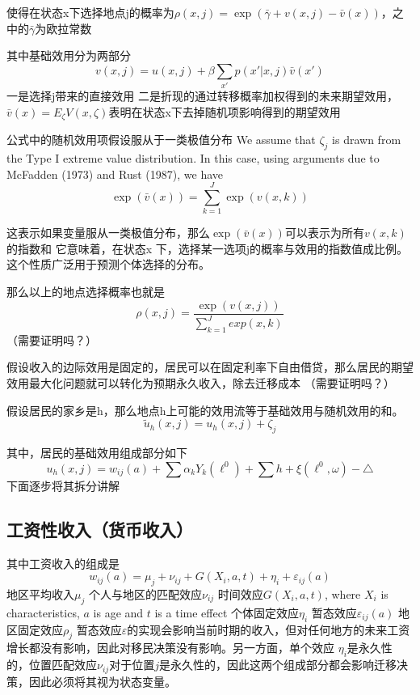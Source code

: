\documentclass[a4paper,10pt]{article}
\begin{document}
使得在状态x下选择地点j的概率为$\rho(x,j)=\exp(\bar \gamma+v(x,j)-\bar v(x))$，之中的$\bar \gamma$为欧拉常数

其中基础效用分为两部分
\begin{equation}
  v(x, j) = u(x, j) + \beta \sum_{x'} p(x' | x, j) \bar{v}(x')
\end{equation}
一是选择j带来的直接效用
二是折现的通过转移概率加权得到的未来期望效用，$\bar{v}(x) = E_{\zeta} V(x, \zeta)$表明在状态x下去掉随机项影响得到的期望效用

公式中的随机效用项假设服从于一类极值分布
We assume that $\zeta_j$ is drawn from the Type I extreme value distribution. In this case, using arguments due to McFadden (1973) and Rust (1987), we have
\begin{equation}
  \exp\left(\bar{v}(x)\right) = \sum_{k=1}^J \exp\left(v(x, k)\right)
\end{equation}

这表示如果变量服从一类极值分布，那么$\exp\left(\bar{v}(x)\right)$可以表示为所有$v(x, k)$的指数和
它意味着，在状态x 下，选择某一选项j的概率与效用的指数值成比例。
这个性质广泛用于预测个体选择的分布。

那么以上的地点选择概率也就是
\begin{equation}
  \rho(x,j)=\frac{\exp(v(x,j))}{\sum\limits_{k=1}^{J} exp(x,k)}
\end{equation}
（需要证明吗？）

假设收入的边际效用是固定的，居民可以在固定利率下自由借贷，那么居民的期望效用最大化问题就可以转化为预期永久收入，除去迁移成本
（需要证明吗？）

假设居民的家乡是h，那么地点h上可能的效用流等于基础效用与随机效用的和。
\begin{equation}
  \tilde u_{h}(x,j)=u_{h}(x,j) +\zeta_j
\end{equation}

其中，居民的基础效用组成部分如下
\begin{equation}
  u_h(x,j)=w_{ij}(a)+\sum\limits \alpha_{k}Y_{k}(\ell^{0})+\sum\limits h +\xi(\ell^{0},\omega)-\triangle
\end{equation}
下面逐步将其拆分讲解


\subsection{工资性收入（货币收入）}
其中工资收入的组成是
\begin{equation}
  w_{ij}(a)=\mu_j+\nu_{ij}+G(X_i,a,t)+\eta_i+\varepsilon_{ij}(a)
\end{equation}
地区平均收入$\mu_j$
个人与地区的匹配效应$\nu_{ij}$
时间效应$G(X_{i},a,t)$, where $X_{i}$ is characteristics, $a$ is age and $t$ is a time effect
个体固定效应$\eta_i$
暂态效应$\varepsilon_{ij}(a)$
地区固定效应$\rho_{j}$
暂态效应$\varepsilon$的实现会影响当前时期的收入，但对任何地方的未来工资增长都没有影响，因此对移民决策没有影响。另一方面，单个效应 $\eta_{i}$是永久性的，位置匹配效应$\nu_{ij}$对于位置$j$是永久性的，因此这两个组成部分都会影响迁移决策，因此必须将其视为状态变量。
\end{document}
